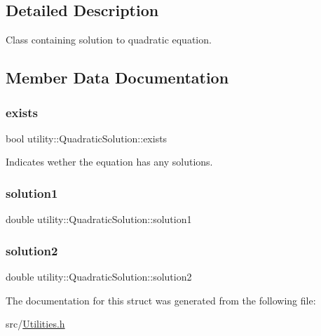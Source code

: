 \subsection{Detailed Description}
Class containing solution to quadratic equation. 

\subsection{Member Data Documentation}
\mbox{\label{structutility_1_1QuadraticSolution_a76dd00a33b769e90b158877ffc0dc7ee}} 
\subsubsection{\texorpdfstring{exists}{exists}}
{\footnotesize\ttfamily bool utility\+::\+Quadratic\+Solution\+::exists}



Indicates wether the equation has any solutions. 

\mbox{\label{structutility_1_1QuadraticSolution_ad5483ce614475c079a24d3fda275b98e}} 
\subsubsection{\texorpdfstring{solution1}{solution1}}
{\footnotesize\ttfamily double utility\+::\+Quadratic\+Solution\+::solution1}

\mbox{\label{structutility_1_1QuadraticSolution_a0841bdbfa4b63ae9e4d0ae95e258f319}} 
\subsubsection{\texorpdfstring{solution2}{solution2}}
{\footnotesize\ttfamily double utility\+::\+Quadratic\+Solution\+::solution2}



The documentation for this struct was generated from the following file\+:\begin{DoxyCompactItemize}
\item 
src/\mbox{\hyperlink{Utilities_8h}{Utilities.\+h}}\end{DoxyCompactItemize}
